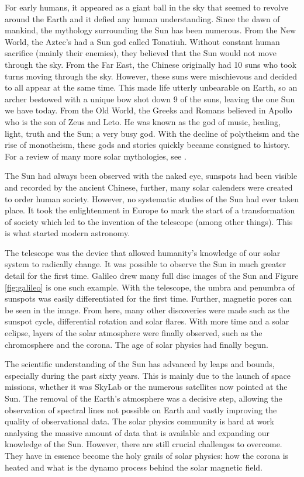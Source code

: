     For early humans, it appeared as a giant ball in the sky that seemed to revolve around the Earth and it defied any human understanding.
    Since the dawn of mankind, the mythology surrounding the Sun has been numerous.    
    From the New World, the Aztec's had a Sun god called Tonatiuh. 
    Without constant human sacrifice (mainly their enemies), they believed that the Sun would not move through the sky.
    From the Far East, the Chinese originally had 10 suns who took turns moving through the sky. 
    However, these suns were mischievous and decided to all appear at the same time. 
    This made life utterly unbearable on Earth, so an archer bestowed with a unique bow shot down 9 of the suns, leaving the one Sun we have today.
    From the Old World, the Greeks and Romans believed in Apollo who is the son of Zeus and Leto.
    He was known as the god of music, healing, light, truth and the Sun; a very busy god.
    With the decline of polytheism and the rise of monotheism, these gods and stories quickly became consigned to history. 
    For a review of many more solar mythologies, see \citet{mythbook}.
    
    The Sun had always been observed with the naked eye, sunspots had been visible and recorded by the ancient Chinese, further, many solar calenders were created to order human society.
    However, no systematic studies of the Sun had ever taken place.
    It took the enlightenment in Europe to mark the start of a transformation of society which led to the invention of the telescope (among other things).
    This is what started modern astronomy.
    
    The telescope was the device that allowed humanity's knowledge of our solar system to radically change.
    It was possible to observe the Sun in much greater detail for the first time.
    Galileo drew many full disc images of the Sun and Figure \ref{fig:galileo} is one such example. 
    With the telescope, the umbra and penumbra of sunspots was easily differentiated for the first time.
    Further, magnetic pores can be seen in the image.
    From here, many other discoveries were made such as the sunspot cycle, differential rotation and solar flares.
    With more time and a solar eclipse, layers of the solar atmosphere were finally observed, such as the chromosphere and the corona.
    The age of solar physics had finally begun.
    
    The scientific understanding of the Sun has advanced by leaps and bounds, especially during the past sixty years.
    This is mainly due to the launch of space missions, whether it was SkyLab or the numerous satellites now pointed at the Sun.
    The removal of the Earth's atmosphere was a decisive step, allowing the observation of spectral lines not possible on Earth and vastly improving the quality of observational data.
    The solar physics community is hard at work analysing the massive amount of data that is available and expanding our knowledge of the Sun.   
    However, there are still crucial challenges to overcome.
    They have in essence become the holy grails of solar physics: how the corona is heated and what is the dynamo process behind the solar magnetic field.

